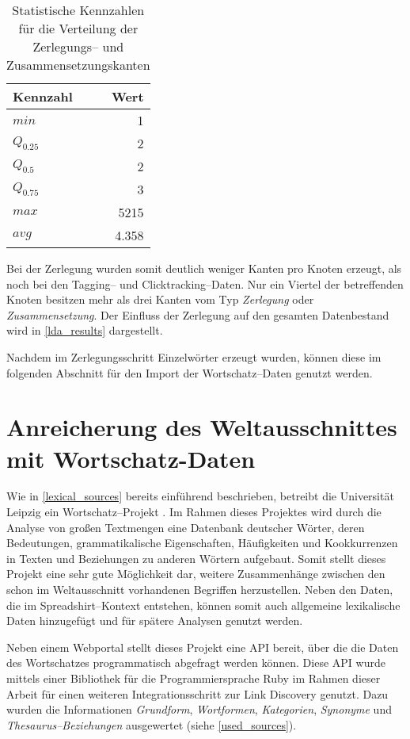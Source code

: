 \begin{table}[h]
\centering
\begin{tabular}{lr}
    \toprule
    Kennzahl & Wert \\
    \midrule
    \(min\) & \num{1} \\
    \(Q_{0.25}\) & \num{2} \\
    \(Q_{0.5}\) & \num{2} \\
    \(Q_{0.75}\) & \num{3} \\
    \(max\) &  \num{5215} \\
    \(avg\) &  \num{4,358} \\
    \bottomrule
\end{tabular}
\caption{Statistische Kennzahlen für die Verteilung der Zerlegungs-- und Zusammensetzungskanten}
\label{tab:only_decomposition}
\end{table}

Bei der Zerlegung wurden somit deutlich weniger Kanten pro Knoten erzeugt, als noch bei den Tagging-- und Clicktracking--Daten. Nur ein Viertel der betreffenden Knoten besitzen mehr als drei Kanten vom Typ \emph{Zerlegung} oder \emph{Zusammensetzung}. Der Einfluss der Zerlegung auf den gesamten Datenbestand wird in \cref{lda_results} dargestellt.

Nachdem im Zerlegungsschritt Einzelwörter erzeugt wurden, können diese im folgenden Abschnitt für den Import der Wortschatz--Daten genutzt werden.

\section{Anreicherung des Weltausschnittes mit Wortschatz-Daten}
\label{wortschatz}

Wie in \cref{lexical_sources} bereits einführend beschrieben, betreibt die Universität Leipzig ein Wortschatz--Projekt \cite{ws2013}. Im Rahmen dieses Projektes wird durch die Analyse von großen Textmengen eine Datenbank deutscher Wörter, deren Bedeutungen, grammatikalische Eigenschaften, Häufigkeiten und Kookkurrenzen in Texten und Beziehungen zu anderen Wörtern aufgebaut. Somit stellt dieses Projekt eine sehr gute Möglichkeit dar, weitere Zusammenhänge zwischen den schon im Weltausschnitt vorhandenen Begriffen herzustellen. Neben den Daten, die im Spreadshirt--Kontext entstehen, können somit auch allgemeine lexikalische Daten hinzugefügt und für spätere Analysen genutzt werden.

Neben einem Webportal \cite{ws2013} stellt dieses Projekt eine API bereit, über die die Daten des Wortschatzes programmatisch abgefragt werden können. Diese API wurde mittels einer Bibliothek für die Programmiersprache Ruby \cite{wlapi2013} im Rahmen dieser Arbeit für einen weiteren Integrationsschritt zur Link Discovery genutzt. Dazu wurden die Informationen \emph{Grundform}, \emph{Wortformen}, \emph{Kategorien}, \emph{Synonyme} und \emph{Thesaurus--Beziehungen} ausgewertet (siehe \cref{used_sources}).

